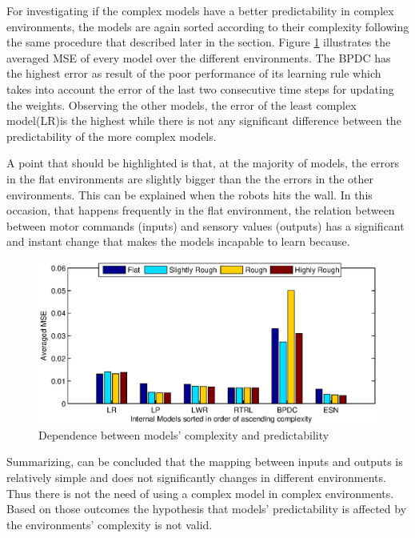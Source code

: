 \documentclass[msc,ai,logo]{infthesis}
\begin{document}
For investigating if the complex models have a better predictability in complex environments, the models are again sorted according to their complexity following the same procedure that described later in the section. Figure \ref{fig:Error_Compl} illustrates the averaged MSE of every model over the different environments. The BPDC has the highest error as result of the poor performance of its learning rule which takes into account the error of the last two consecutive time steps for updating the weights. Observing the other models, the error of the least complex model(LR)is the highest while there is not any significant difference between the predictability of the more complex models.

A point that should be highlighted is that, at the majority of models, the errors in the flat environments are slightly bigger than the the errors in the other environments. This can be explained when the robots hits the wall. In this occasion, that happens frequently in the flat environment, the relation between between motor commands (inputs) and sensory values (outputs) has a significant and instant change that makes the models incapable to learn because.   

\begin{figure}[H]
\includegraphics[scale=0.78]{Error_Complex.eps}
\centering
\caption{Dependence between models' complexity and predictability }
\label{fig:Error_Compl}
\end{figure}

Summarizing, can be concluded that the mapping between inputs and outputs is relatively simple and does not significantly changes in different environments. Thus there is not the need of using a complex model in complex environments. Based on those outcomes the hypothesis that models' predictability is affected by the environments' complexity is not valid.  

\end{document}

